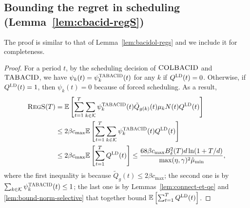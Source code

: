 \subsection{Bounding the regret in scheduling (Lemma~\ref{lem:cbacid-regS})}\label{app:lem-cbacid-regS}
The proof is similar to that of Lemma~\ref{lem:bacidol-regs} and we include it for completeness.
\begin{proof}
For a period $t$, by the scheduling decision of $\textsc{COLBACID}$ and $\textsc{TABACID}$, we have $\psi_k(t) = \psi_k^{\textsc{TABACID}}(t)$ for any $k$ if $Q^{\mathcal{\textsc{LD}}}(t) = 0$. Otherwise, if $Q^{\mathcal{\textsc{LD}}}(t) = 1$, then $\psi_k(t) = 0$ because of forced scheduling. As a result,
\begin{align*}
\textsc{RegS}(T) &= \mathbb E\left[\sum_{t=1}^T \sum_{k \in \mathcal{K}} \psi_k^{\textsc{TABACID}}(t)\tilde{Q}_{g(k)}(t)\mu_k N(t) Q^{\mathcal{\textsc{LD}}}(t)\right] \\
&\leq 2\beta c_{\max}\mathbb E\left[\sum_{t=1}^T \sum_{k \in \mathcal{K}} \psi_k^{\textsc{TABACID}}(t)Q^{\mathcal{\textsc{LD}}}(t)\right] \\
&\leq 2\beta c_{\max}\mathbb E\left[\sum_{t=1}^T Q^{\mathcal{\textsc{LD}}}(t)\right] \leq \frac{68\beta c_{\max}B_{\delta}^2(T)d\ln(1+T/d)}{\max(\eta,\gamma)^2\hat{\mu}_{\min}},
\end{align*}
where the first inequality is because $\tilde{Q}_g(t) \leq 2\beta c_{\max}$; the second one is by $\sum_{k \in \mathcal{K}} \psi_k^{\textsc{TABACID}}(t) \leq 1$; the last one is by Lemmas~\ref{lem:connect-et-qe} and \ref{lem:bound-norm-selective} that together bound $\mathbb E\left[\sum_{t=1}^T Q^{\mathcal{\textsc{LD}}}(t)\right]$.
\end{proof}

